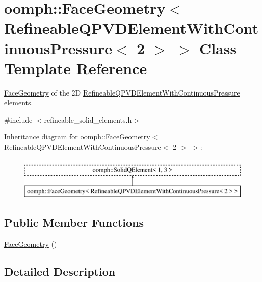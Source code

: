 \hypertarget{classoomph_1_1FaceGeometry_3_01RefineableQPVDElementWithContinuousPressure_3_012_01_4_01_4}{}\section{oomph\+:\+:Face\+Geometry$<$ Refineable\+Q\+P\+V\+D\+Element\+With\+Continuous\+Pressure$<$ 2 $>$ $>$ Class Template Reference}
\label{classoomph_1_1FaceGeometry_3_01RefineableQPVDElementWithContinuousPressure_3_012_01_4_01_4}


\hyperlink{classoomph_1_1FaceGeometry}{Face\+Geometry} of the 2D \hyperlink{classoomph_1_1RefineableQPVDElementWithContinuousPressure}{Refineable\+Q\+P\+V\+D\+Element\+With\+Continuous\+Pressure} elements.  




{\ttfamily \#include $<$refineable\+\_\+solid\+\_\+elements.\+h$>$}

Inheritance diagram for oomph\+:\+:Face\+Geometry$<$ Refineable\+Q\+P\+V\+D\+Element\+With\+Continuous\+Pressure$<$ 2 $>$ $>$\+:\begin{figure}[H]
\begin{center}
\leavevmode
\includegraphics[height=2.000000cm]{classoomph_1_1FaceGeometry_3_01RefineableQPVDElementWithContinuousPressure_3_012_01_4_01_4}
\end{center}
\end{figure}
\subsection*{Public Member Functions}
\begin{DoxyCompactItemize}
\item 
\hyperlink{classoomph_1_1FaceGeometry_3_01RefineableQPVDElementWithContinuousPressure_3_012_01_4_01_4_a2f1ffc750cf598e1aaf58754a1b442e6}{Face\+Geometry} ()
\end{DoxyCompactItemize}


\subsection{Detailed Description}
